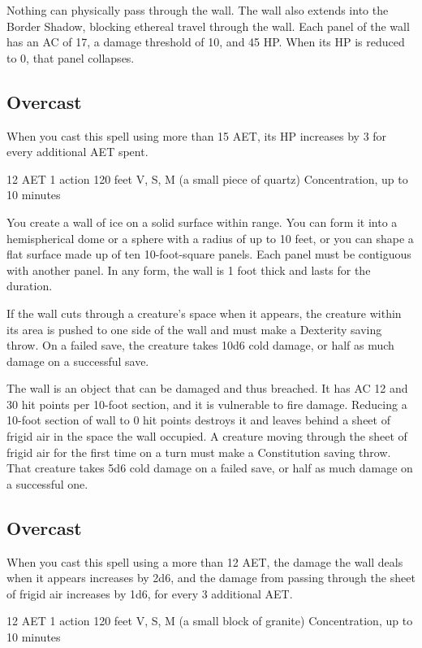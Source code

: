 Nothing can physically pass through the wall. The wall also extends into the Border Shadow, blocking ethereal travel through the wall. Each panel of the wall has an AC of 17, a damage threshold of 10, and 45 HP. When its HP is reduced to 0, that panel collapses.

\subsection*{Overcast} When you cast this spell using more than 15 AET, its HP increases by 3 for every additional AET spent.


{12 AET}
{1 action}
{120 feet}
{V, S, M (a small piece of quartz)}
{Concentration, up to 10 minutes}

You create a wall of ice on a solid surface within range. You can form it into a hemispherical dome or a sphere with a radius of up to 10 feet, or you can shape a flat surface made up of ten 10-foot-square panels. Each panel must be contiguous with another panel. In any form, the wall is 1 foot thick and lasts for the duration.

If the wall cuts through a creature's space when it appears, the creature within its area is pushed to one side of the wall and must make a Dexterity saving throw. On a failed save, the creature takes 10d6 cold damage, or half as much damage on a successful save.

The wall is an object that can be damaged and thus breached. It has AC 12 and 30 hit points per 10-foot section, and it is vulnerable to fire damage. Reducing a 10-foot section of wall to 0 hit points destroys it and leaves behind a sheet of frigid air in the space the wall occupied. A creature moving through the sheet of frigid air for the first time on a turn must make a Constitution saving throw. That creature takes 5d6 cold damage on a failed save, or half as much damage on a successful one.

\subsection*{Overcast} When you cast this spell using a more than 12 AET, the damage the wall deals when it appears increases by 2d6, and the damage from passing through the sheet of frigid air increases by 1d6, for every 3 additional AET.


{12 AET}
{1 action}
{120 feet}
{V, S, M (a small block of granite)}
{Concentration, up to 10 minutes}

